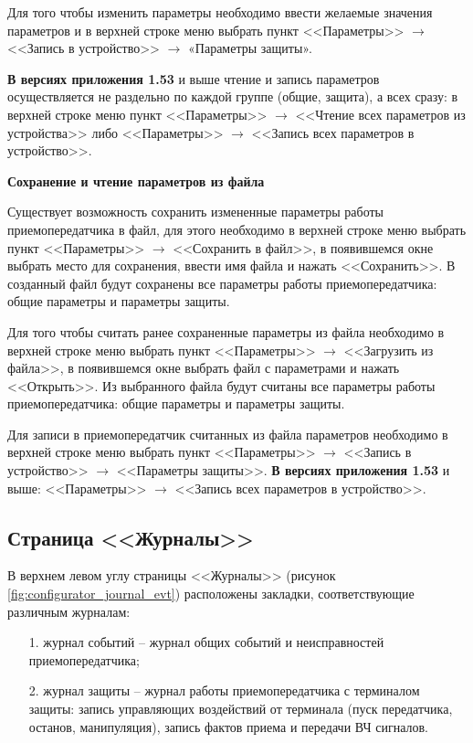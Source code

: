 Для того чтобы изменить параметры необходимо ввести желаемые значения параметров и в верхней строке меню выбрать пункт <<Параметры>> $\rightarrow$ <<Запись в устройство>> $\rightarrow$ «Параметры защиты».

\textbf{В версиях приложения 1.53} и выше чтение и запись параметров осуществляется не раздельно по каждой группе (общие, защита), а всех сразу: в верхней строке меню пункт <<Параметры>> $\rightarrow$ <<Чтение всех параметров из устройства>> либо <<Параметры>> $\rightarrow$ <<Запись всех параметров в устройство>>. 
\newline 

\textbf{Сохранение и чтение параметров из файла}

Существует возможность сохранить измененные параметры работы приемопередатчика в файл, для этого необходимо в верхней строке меню выбрать пункт <<Параметры>> $\rightarrow$ <<Сохранить в файл>>, в появившемся окне выбрать место для сохранения, ввести имя файла и нажать <<Сохранить>>. В созданный файл будут сохранены все параметры работы приемопередатчика: общие параметры и параметры защиты.

Для того чтобы считать ранее сохраненные параметры из файла необходимо в верхней строке меню выбрать пункт <<Параметры>> $\rightarrow$ <<Загрузить из файла>>, в появившемся окне выбрать файл с параметрами и нажать <<Открыть>>. Из выбранного файла будут считаны все параметры работы приемопередатчика: общие параметры и параметры защиты. 

Для записи в приемопередатчик считанных из файла параметров необходимо в верхней строке меню выбрать пункт <<Параметры>> $\rightarrow$ <<Запись в устройство>> $\rightarrow$ <<Параметры защиты>>. \textbf{В версиях приложения 1.53} и выше: <<Параметры>> $\rightarrow$ <<Запись всех параметров в устройство>>.


\subsection{Страница <<Журналы>>}	\label{ssec:configurator_journal}

В верхнем левом углу страницы <<Журналы>> (рисунок \ref{fig:configurator_journal_evt}) расположены закладки, соответствующие различным журналам:
\begin{enumerate}
	\item[1.] журнал событий – журнал общих событий и неисправностей приемопередатчика;
	\item[2.] журнал защиты – журнал работы приемопередатчика с терминалом защиты: запись управляющих воздействий от терминала (пуск передатчика, останов, манипуляция), запись фактов приема и передачи ВЧ сигналов.
\end{enumerate}

